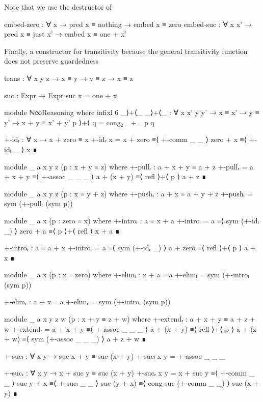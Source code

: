 Note that we use the destructor  of 
\begin{code}
    embed-zero : ∀ x → pred x ≡ nothing → embed x ≡ zero
    embed-suc : ∀ x x' → pred x ≡ just x' → embed x ≡ one + x'
\end{code}
Finally, a constructor for transitivity because the general transitivity
function does not preserve guardedness
\begin{code}
    trans : ∀ {x y z} → x ≡ y → y ≡ z → x ≡ z
\end{code}
\begin{code}[hide]
  suc : Expr → Expr
  suc x = one + x

  module ℕ∞Reasoning where
    infixl 6 _⟩+⟨_
    _⟩+⟨_ : ∀ {x x' y y'} → x ≡ x' → y ≡ y' → x + y ≡ x' + y'
    p ⟩+⟨ q = cong₂ _+_ p q

    +-idᵣ : ∀ x → x + zero ≡ x
    +-idᵣ x =
      x + zero ≡⟨ +-comm _ _ ⟩
      zero + x ≡⟨ +-idₗ _ ⟩
      x        ∎

    module _ {a x y z} (p : x + y ≡ z) where
      +-pullᵣ : a + x + y ≡ a + z
      +-pullᵣ =
        a + x + y   ≡⟨ +-assoc _ _ _ ⟩
        a + (x + y) ≡⟨ refl ⟩+⟨ p ⟩
        a + z       ∎

    module _ {a x y z} (p : x ≡ y + z) where
      +-pushᵣ : a + x ≡ a + y + z
      +-pushᵣ = sym (+-pullᵣ (sym p))

    module _ {a x} (p : zero ≡ x) where
      +-introₗ : a ≡ x + a
      +-introₗ =
        a        ≡⟨ sym (+-idₗ _) ⟩
        zero + a ≡⟨ p ⟩+⟨ refl ⟩
        x + a    ∎

      +-introᵣ : a ≡ a + x
      +-introᵣ =
        a        ≡⟨ sym (+-idᵣ _) ⟩
        a + zero ≡⟨ refl ⟩+⟨ p ⟩
        a + x    ∎

    module _ {a x} (p : x ≡ zero) where
      +-elimₗ : x + a ≡ a
      +-elimₗ = sym (+-introₗ (sym p))

      +-elimᵣ : a + x ≡ a
      +-elimᵣ = sym (+-introᵣ (sym p))

    module _ {a x y z w} (p : x + y ≡ z + w) where
      +-extendᵣ : a + x + y ≡ a + z + w
      +-extendᵣ =
        a + x + y   ≡⟨ +-assoc _ _ _ ⟩
        a + (x + y) ≡⟨ refl ⟩+⟨ p ⟩
        a + (z + w) ≡⟨ sym (+-assoc _ _ _) ⟩
        a + z + w   ∎

    +-sucₗ : ∀ x y → suc x + y ≡ suc (x + y)
    +-sucₗ x y = +-assoc _ _ _

    +-sucᵣ : ∀ x y → x + suc y ≡ suc (x + y)
    +-sucᵣ x y =
      x + suc y   ≡⟨ +-comm _ _ ⟩
      suc y + x   ≡⟨ +-sucₗ _ _ ⟩
      suc (y + x) ≡⟨ cong suc (+-comm _ _) ⟩
      suc (x + y) ∎


\end{code}
